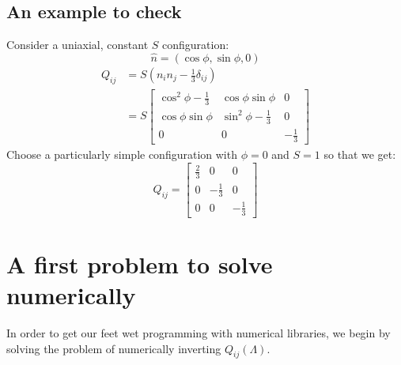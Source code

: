 \documentclass[reqno]{article}
\begin{document}
	\subsection{An example to check}
	Consider a uniaxial, constant $S$ configuration:
	\begin{equation}
		\hat{n} = (\cos\phi, \sin\phi, 0)
	\end{equation}
	\begin{equation}
	\begin{split}
		Q_{ij} 
		&= S (n_i n_j - \tfrac13 \delta_{ij}) \\
		&= S 
		\begin{bmatrix}
			\cos^2\phi - \tfrac13 & \cos\phi \sin\phi & 0 \\
			\cos\phi \sin\phi & \sin^2\phi - \tfrac13 & 0 \\
			0 & 0 & -\tfrac13
		\end{bmatrix}
	\end{split}
	\end{equation}
	Choose a particularly simple configuration with $\phi = 0$ and $S = 1$ so that we get:
	\begin{equation}
		Q_{ij} = 
		\begin{bmatrix}
			\tfrac23 &0 &0 \\
			0 &-\tfrac13 &0 \\
			0 &0 &-\tfrac13
		\end{bmatrix}
	\end{equation}
	
	
	\section{A first problem to solve numerically}
	In order to get our feet wet programming with numerical libraries, we begin by solving the problem of numerically inverting $Q_{ij} (\Lambda)$.
	
	
	
\end{document}
